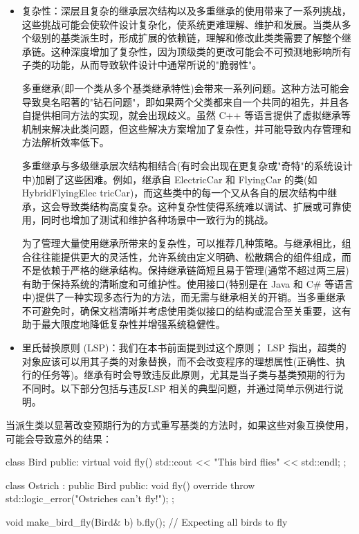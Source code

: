 \begin{itemize}
\item
复杂性：深层且复杂的继承层次结构以及多重继承的使用带来了一系列挑战，这些挑战可能会使软件设计复杂化，使系统更难理解、维护和发展。当类从多个级别的基类派生时，形成扩展的依赖链，理解和修改此类类需要了解整个继承链。这种深度增加了复杂性，因为顶级类的更改可能会不可预测地影响所有子类的功能，从而导致软件设计中通常所说的"脆弱性"。

多重继承(即一个类从多个基类继承特性)会带来一系列问题。这种方法可能会导致臭名昭著的"钻石问题"，即如果两个父类都来自一个共同的祖先，并且各自提供相同方法的实现，就会出现歧义。虽然 C++ 等语言提供了虚拟继承等机制来解决此类问题，但这些解决方案增加了复杂性，并可能导致内存管理和方法解析效率低下。

多重继承与多级继承层次结构相结合(有时会出现在更复杂或"奇特"的系统设计中)加剧了这些困难。例如，继承自 ElectricCar 和 FlyingCar 的类(如 HybridFlyingElec tricCar)，而这些类中的每一个又从各自的层次结构中继承，这会导致类结构高度复杂。这种复杂性使得系统难以调试、扩展或可靠使用，同时也增加了测试和维护各种场景中一致行为的挑战。

为了管理大量使用继承所带来的复杂性，可以推荐几种策略。与继承相比，组合往往能提供更大的灵活性，允许系统由定义明确、松散耦合的组件组成，而不是依赖于严格的继承结构。保持继承链简短且易于管理(通常不超过两三层)有助于保持系统的清晰度和可维护性。使用接口(特别是在 Java 和 C\# 等语言中)提供了一种实现多态行为的方法，而无需与继承相关的开销。当多重继承不可避免时，确保文档清晰并考虑使用类似接口的结构或混合至关重要，这有助于最大限度地降低复杂性并增强系统稳健性。

\item
里氏替换原则 (LSP)：我们在本书前面提到过这个原则； LSP 指出，超类的对象应该可以用其子类的对象替换，而不会改变程序的理想属性(正确性、执行的任务等)。继承有时会导致违反此原则，尤其是当子类与基类预期的行为不同时。以下部分包括与违反LSP 相关的典型问题，并通过简单示例进行说明。
\end{itemize}


当派生类以显著改变预期行为的方式重写基类的方法时，如果这些对象互换使用，可能会导致意外的结果：

\begin{cpp}
class Bird {
public:
    virtual void fly() {
        std::cout << "This bird flies" << std::endl;
    }
};

class Ostrich : public Bird {
public:
    void fly() override {
        throw std::logic_error("Ostriches can't fly!");
    }
};

void make_bird_fly(Bird& b) {
    b.fly(); // Expecting all birds to fly
}
\end{cpp}

